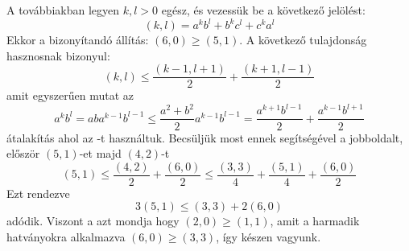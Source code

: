 A továbbiakban legyen $k,l>0$ egész, és vezessük be a következő jelölést:
$$
(k,l)=a^{k}b^{l} + b^{k}c^{l} + c^{k}a^{l}
$$
Ekkor a bizonyítandó állítás: $(6,0) \ge (5,1).$ A következő tulajdonság hasznosnak 
bizonyul:
$$
(k,l) \le \frac{(k-1,l+1)}{2} + \frac{(k+1,l-1)}{2}
$$
amit egyszerűen mutat az
$$
a^{k}b^{l}=aba^{k-1}b^{l-1}\le \frac{a^{2}+b^{2}}{2}a^{k-1}b^{l-1} = 
\frac{a^{k+1}b^{l-1}}{2}+\frac{a^{k-1}b^{l+1}}{2}
$$
átalakítás ahol az -t használtuk. Becsüljük most ennek 
segítségével a jobboldalt, először $(5,1)$-et majd $(4,2)$-t
$$
(5,1) \le \frac{(4,2)}{2} + \frac{(6,0)}{2} \le
\frac{(3,3)}{4} + \frac{(5,1)}{4} + \frac{(6,0)}{2}
$$
Ezt rendezve
$$
3(5,1) \le (3,3) + 2(6,0) 
$$
adódik. Viszont a  azt mondja hogy $(2,0) \ge (1,1)$, 
amit a harmadik hatványokra alkalmazva $(6,0) \ge (3,3)$, így készen vagyunk.




